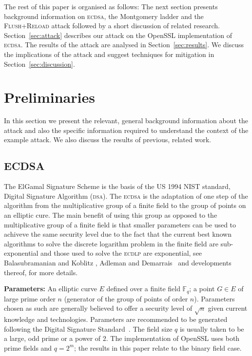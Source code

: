 \documentclass[twocolumn]{svjour3}
\newcommand{\F}{{\mathbb F}}
\begin{document}
The rest of this paper is organised as follows: The next section presents background information on \textsc{ecdsa}, the Montgomery ladder and the \textsc{Flush+Reload} attack followed by a short discussion of related research. %
Section~\ref{sec:attack} describes our attack on the OpenSSL implementation of \textsc{ecdsa}.
The results of the attack are analysed in Section~\ref{sec:results}.
We discuss the implications of the attack and suggest techniques for mitigation in Section~\ref{sec:discussion}.

\section{Preliminaries}\label{sec:background}
In this section we present the relevant, general background information about the attack and also the specific information required to understand the context of the example attack. We also discuss the results of previous, related work.

\subsection{ECDSA}\label{sub:ecdsa}

The ElGamal Signature Scheme \cite{Elgamal85} is the basis of the US 1994 NIST standard, Digital Signature Algorithm (\textsc{dsa}). The \textsc{ecdsa} is the adaptation of one step of the algorithm from the multiplicative group of a finite field to the group of points on an elliptic cure. The main benefit of using this group as opposed to the multiplicative group of a finite field is that smaller parameters can be used to achiveve the same security level \cite{koblitz87elliptic,miller85use} due to the fact that the current best known algorithms to solve the discrete logarithm problem in the finite field are sub-exponential and those used to solve the \textsc{ecdlp} are exponential, see Balasubramanian and Koblitz \cite{balasubramanian-koblitz}, Adleman and Demarrais~\cite{adelman-demarrais} and developments thereof, for more details. 


{\bf{Parameters:}} An elliptic curve $E$ defined over a finite field $\F_{q}$; a point $G\in E$ of large prime order $n$ (generator of the group of points of order $n$). Parameters chosen as such are generally believed to offer a security level of $\sqrt{n}$ given current knowledge and technologies. Parameters are recommended to be generated following the Digital Signature Standard~\cite{fips}. The field size $q$ is usually taken to be a large, odd prime or a power of $2$. The implementation of OpenSSL uses both prime fields and $q=2^m$; the results in this paper relate to the binary field case.
\end{document}
